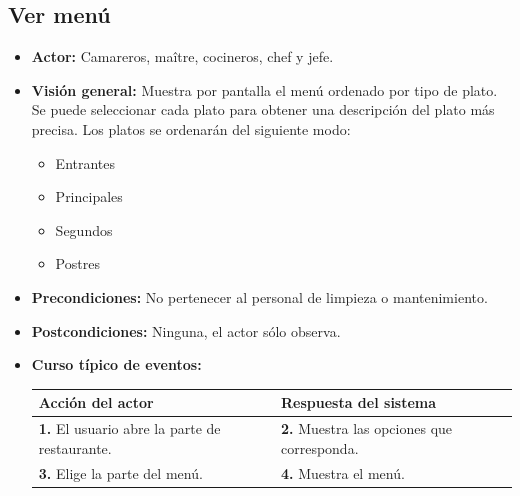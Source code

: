 \documentclass[spanish,a4paper,11pt, twoside]{report}	%
\begin{document}
 	
	\subsection{Ver menú}
			\begin{itemize}
			\item \textbf{Actor:} Camareros, maître, cocineros, chef y jefe.
			\item \textbf{Visión general:} Muestra por pantalla el menú ordenado por tipo de
				plato. Se puede seleccionar cada plato para obtener una descripción del plato más
				precisa. Los platos se ordenarán del siguiente modo:
			\begin{itemize}
				\item 	 Entrantes
				\item 	 Principales
				\item 	 Segundos
				\item 	 Postres
				\end {itemize}
			\item \textbf{Precondiciones:} No pertenecer al personal de limpieza o mantenimiento.
			\item \textbf{Postcondiciones:} Ninguna, el actor sólo observa.
			\item \textbf{Curso típico de eventos:} 	\\
				\begin{tabular}{|p{6cm}||p{6cm}|}
				\hline
				\textbf{Acción del actor} & \textbf{Respuesta del sistema} \\ \hline \hline
				\textbf{1.} El usuario abre la parte de restaurante. & 
				\textbf{2.} Muestra las opciones que corresponda.\\ \hline 
				\textbf{3.} Elige la parte del menú. & 
				\textbf{4.} Muestra el menú. \\ \hline
			\end{tabular}
		\end {itemize}



\end{document}
